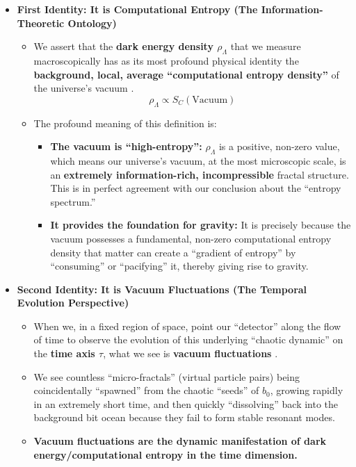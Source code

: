 \documentclass[11pt, a4paper]{article}
\begin{document}
\begin{itemize}
    \item \textbf{First Identity: It is Computational Entropy (The Information-Theoretic Ontology)}
    \begin{itemize}
        \item We assert that the \textbf{dark energy density $\rho_\Lambda$} that we measure macroscopically has as its most profound physical identity the \textbf{background, local, average ``computational entropy density''} of the universe's vacuum \cite{Kolmogorov1965, Planck2020}.
        \[
        \rho_\Lambda \propto S_C(\text{Vacuum})
        \]
        \item The profound meaning of this definition is:
        \begin{itemize}
            \item \textbf{The vacuum is ``high-entropy'':} $\rho_\Lambda$ is a positive, non-zero value, which means our universe's vacuum, at the most microscopic scale, is an \textbf{extremely information-rich, incompressible} fractal structure. This is in perfect agreement with our conclusion about the ``entropy spectrum.''
            \item \textbf{It provides the foundation for gravity:} It is precisely because the vacuum possesses a fundamental, non-zero computational entropy density that matter can create a ``gradient of entropy'' by ``consuming'' or ``pacifying'' it, thereby giving rise to gravity.
        \end{itemize}
    \end{itemize}

    \item \textbf{Second Identity: It is Vacuum Fluctuations (The Temporal Evolution Perspective)}
    \begin{itemize}
        \item When we, in a fixed region of space, point our ``detector'' along the flow of time to observe the evolution of this underlying ``chaotic dynamic'' on the \textbf{time axis $\tau$}, what we see is \textbf{vacuum fluctuations} \cite{deBroglie1930}.
        \item We see countless ``micro-fractals'' (virtual particle pairs) being coincidentally ``spawned'' from the chaotic ``seeds'' of $b_0$, growing rapidly in an extremely short time, and then quickly ``dissolving'' back into the background bit ocean because they fail to form stable resonant modes.
        \item \textbf{Vacuum fluctuations are the dynamic manifestation of dark energy/computational entropy in the time dimension.}
    \end{itemize}


\end{itemize}
\end{document}
